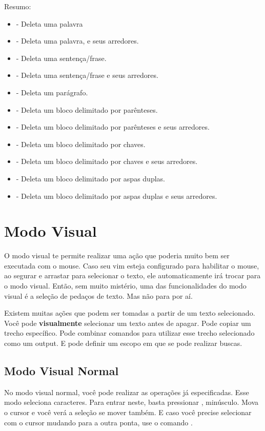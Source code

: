 Resumo:
\begin{itemize}
    \item {} - Deleta uma palavra
    \item {} - Deleta uma palavra, e seus arredores.
    \item {} - Deleta uma sentença/frase.
    \item {} - Deleta uma sentença/frase e seus arredores.
    \item {} - Deleta um parágrafo.
    \item {} - Deleta um bloco delimitado por parênteses.
    \item {} - Deleta um bloco delimitado por parênteses e seus arredores.
    \item {} - Deleta um bloco delimitado por chaves.
    \item {} - Deleta um bloco delimitado por chaves e seus arredores.
    \item {} - Deleta um bloco delimitado por aspas duplas.
    \item {} - Deleta um bloco delimitado por aspas duplas e seus arredores.
\end{itemize}

\section{Modo Visual}
O modo visual te permite realizar uma ação que poderia muito bem ser executada com o mouse.
Caso seu vim esteja configurado para habilitar o mouse, ao segurar e arrastar para selecionar o texto, ele automaticamente irá trocar para o modo visual.
Então, sem muito mistério, uma das funcionalidades do modo visual é a seleção de pedaços de texto. Mas não para por aí.

Existem muitas ações que podem ser tomadas a partir de um texto selecionado. Você pode \textbf{visualmente} selecionar um texto antes de apagar.
Pode copiar um trecho específico.
Pode combinar comandos para utilizar esse trecho selecionado como um output.
E pode definir um escopo em que se pode realizar buscas.

\subsection{Modo Visual Normal}
No modo visual normal, você pode realizar as operações já especificadas.
Esse modo seleciona caracteres.
Para entrar neste, basta pressionar , minúsculo.
Mova o cursor e você verá a seleção se mover também.
E caso você precise selecionar com o cursor mudando para a outra ponta, use o comando .


